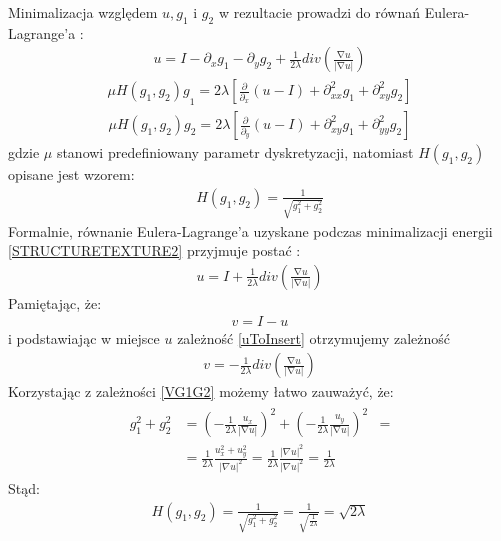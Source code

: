 \documentclass[12pt, twoside, openany]{report}
\theoremstyle{definition}
\begin{document}
Minimalizacja względem $u, g_1$ i $g_2$ w rezultacie prowadzi do równań Eulera-Lagrange'a \cite{vese2003modeling}:
\begin{align}
u=I-{\partial }_xg_1-{\partial }_yg_2+\frac{1}{2\lambda }div\left(\frac{\mathrm{\nabla }u}{\left|\mathrm{\nabla }u\right|}\right)
\label{EL1}
\end{align}
\begin{align}
{\mu H\left(g_1,g_2\right)g}_1=2\lambda \left[\frac{\partial }{{\partial }_x}\left(u-I\right)+{\partial }^2_{xx}g_1+{\partial }^2_{xy}g_2\right]
\label{EL2}
\end{align}
\begin{align}
\mu H\left(g_1,g_2\right)g_2=2\lambda \left[\frac{\partial }{{\partial }_y}\left(u-I\right)+{\partial }^2_{xy}g_1+{\partial }^2_{yy}g_2\right]
\label{EL3}
\end{align}
gdzie $\mu$ stanowi predefiniowany parametr dyskretyzacji, natomiast $H\left(g_1,g_2\right)$ opisane jest wzorem:
\begin{align}
H\left(g_1,g_2\right)=\frac{1}{\sqrt{g^2_1+g^2_2}}
\end{align}
Formalnie, równanie Eulera-Lagrange'a uzyskane podczas minimalizacji energii \eqref{STRUCTURETEXTURE2} przyjmuje postać \cite{vese2003modeling}:
\begin{align}
u=I+\frac{1}{2\lambda }div\left(\frac{\mathrm{\nabla }u}{\left|\mathrm{\nabla }u\right|}\right)
\label{uToInsert}
\end{align}
Pamiętając, że:
\begin{align}
v = I -u
\end{align}
i podstawiając w miejsce $u$ zależność \eqref{uToInsert} otrzymujemy zależność
\begin{align}
v=-\frac{1}{2\lambda }div\left(\frac{\mathrm{\nabla }u}{\left|\mathrm{\nabla }u\right|}\right)
\end{align}
Korzystając z zależności \eqref{VG1G2} możemy łatwo zauważyć, że:
\begin{align}
\begin{aligned}
g^2_1+g^2_2 & = 
\left(-\frac{1}{2\lambda }\frac{u_x}{\left|\mathrm{\nabla }u\right|}\right)^2 +  \left(-\frac{1}{2\lambda }\frac{u_y}{\left|\mathrm{\nabla }u\right|}\right)^2 &=\\
&= \frac{1}{2\lambda} \frac{u_x^2 + u_y^2 }{|\nabla u|^2} = \frac{1}{2\lambda} \frac{|\nabla u|^2}{|\nabla u|^2} = \frac{1}{2\lambda}
\end{aligned}
\end{align}
Stąd:
\begin{align}
H\left(g_1,g_2\right)=\frac{1}{\sqrt{g^2_1+g^2_2}} = \frac{1}{\sqrt{\frac{1}{2\lambda}}} = \sqrt{2\lambda}
\end{align}
\end{document}
